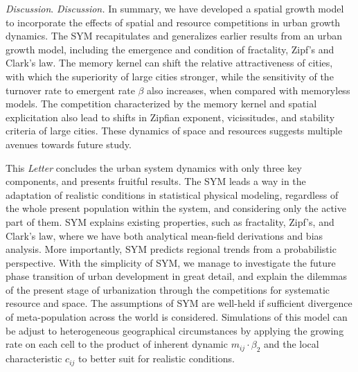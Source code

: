 \documentclass[reprint,unsortedaddress,amsmath,amssymb,aps,prl,showkeys]{revtex4-2}
\begin{document}
\textit{Discussion}. 
\textit{Discussion.} In summary, we have developed a spatial growth model to incorporate the effects of spatial and resource competitions in urban growth dynamics. The SYM recapitulates and generalizes earlier results from an urban growth model, including the emergence and condition of fractality, Zipf's and Clark's law. The memory kernel can shift the relative attractiveness of cities, with which the superiority of large cities stronger, while the sensitivity of the turnover rate to emergent rate $\beta$ also increases, when compared with memoryless models. The competition characterized by the memory kernel and spatial explicitation also lead to shifts in Zipfian exponent, vicissitudes, and stability criteria of large cities. These dynamics of space and resources suggests multiple avenues towards future study.

This \emph{Letter} concludes the urban system dynamics with only three key components, and presents fruitful results. The SYM leads a way in the adaptation of realistic conditions in statistical physical modeling, regardless of the whole present population within the system, and considering only the active part of them. SYM explains existing properties, such as fractality, Zipf's, and Clark's law, where we have both analytical mean-field derivations and bias analysis. More importantly, SYM predicts regional trends from a probabilistic perspective. With the simplicity of SYM, we manage to investigate the future phase transition of urban development in great detail, and explain the dilemmas of the present stage of urbanization through the competitions for systematic resource and space. The assumptions of SYM are well-held if sufficient divergence of meta-population across the world is considered. Simulations of this model can be adjust to heterogeneous geographical circumstances by applying the growing rate on each cell to the product of inherent dynamic $m_{ij}\cdot \beta_2$ and the local characteristic $c_{ij}$ to better suit for realistic conditions.
\end{document}
